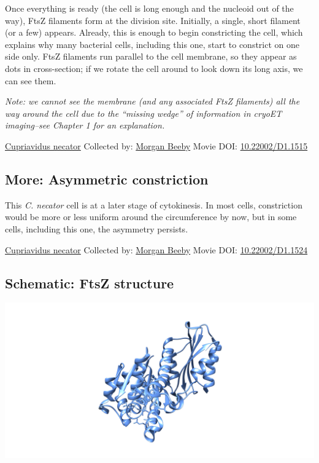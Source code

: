 \documentclass[]{tufte-book}
\begin{document}
Once everything is ready (the cell is long enough and the nucleoid out of the way), FtsZ filaments form at the division site. Initially, a single, short filament (or a few) appears. Already, this is enough to begin constricting the cell, which explains why many bacterial cells, including this one, start to constrict on one side only. FtsZ filaments run parallel to the cell membrane, so they appear as dots in cross-section; if we rotate the cell around to look down its long axis, we can see them.

\emph{Note: we cannot see the membrane (and any associated FtsZ filaments) all the way around the cell due to the ``missing wedge'' of information in cryoET imaging--see Chapter 1 for an explanation.}



\hypertarget{htmlwidget-72f4d426a2af93e7d95f}{}

\label{fig:5-9}\protect\hyperlink{tree}{Cupriavidus necator} Collected by: \protect\hyperlink{morgan_beeby}{Morgan Beeby} Movie DOI: \href{https://doi.org/10.22002/D1.1515}{10.22002/D1.1515}

\hypertarget{Asymmetric_constriction}{%
\subsection*{More: Asymmetric constriction}\label{Asymmetric_constriction}}

This \emph{C. necator} cell is at a later stage of cytokinesis. In most cells, constriction would be more or less uniform around the circumference by now, but in some cells, including this one, the asymmetry persists.



\hypertarget{htmlwidget-65312404495b8e0c91f9}{}

\label{fig:5-9a}\protect\hyperlink{tree}{Cupriavidus necator} Collected by: \protect\hyperlink{morgan_beeby}{Morgan Beeby} Movie DOI: \href{https://doi.org/10.22002/D1.1524}{10.22002/D1.1524}

\hypertarget{FtsZ_structure}{%
\subsection*{Schematic: FtsZ structure}\label{FtsZ_structure}}

\includegraphics{img/schematics/5_9_1}
\end{document}
